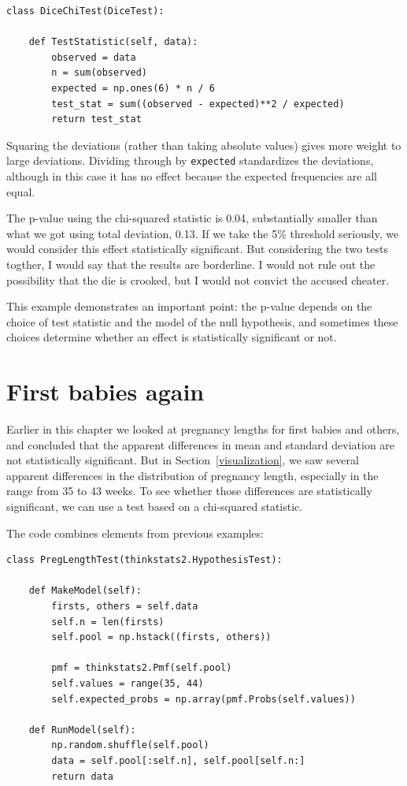 \documentclass[12pt]{book}
\begin{document}
\begin{verbatim}
class DiceChiTest(DiceTest):

    def TestStatistic(self, data):
        observed = data
        n = sum(observed)
        expected = np.ones(6) * n / 6
        test_stat = sum((observed - expected)**2 / expected)
        return test_stat
\end{verbatim}

Squaring the deviations (rather than taking absolute values) gives
more weight to large deviations.  Dividing through by \verb"expected"
standardizes the deviations, although in this case it has no effect
because the expected frequencies are all equal.

The p-value using the chi-squared statistic is 0.04,
substantially smaller than what we got using total deviation, 0.13.
If we take the 5\% threshold seriously, we would consider this effect
statistically significant.  But considering the two tests togther, I
would say that the results are borderline.  I would not rule out the
possibility that the die is crooked, but I would not convict the
accused cheater.
   

This example demonstrates an important point: the p-value depends
on the choice of test statistic and the model of the null hypothesis,
and sometimes these choices determine whether an effect is
statistically significant or not.


\section{First babies again}

Earlier in this chapter we looked at pregnancy lengths for first
babies and others, and concluded that the apparent differences in
mean and standard deviation are not statistically significant.  But in
Section~\ref{visualization}, we saw several apparent differences
in the distribution of pregnancy length, especially in the range from
35 to 43 weeks.  To see whether those differences are statistically
significant, we can use a test based on a chi-squared statistic.
 

The code combines elements from previous examples:

\begin{verbatim}
class PregLengthTest(thinkstats2.HypothesisTest):

    def MakeModel(self):
        firsts, others = self.data
        self.n = len(firsts)
        self.pool = np.hstack((firsts, others))

        pmf = thinkstats2.Pmf(self.pool)
        self.values = range(35, 44)
        self.expected_probs = np.array(pmf.Probs(self.values))

    def RunModel(self):
        np.random.shuffle(self.pool)
        data = self.pool[:self.n], self.pool[self.n:]
        return data
\end{verbatim}
\end{document}
